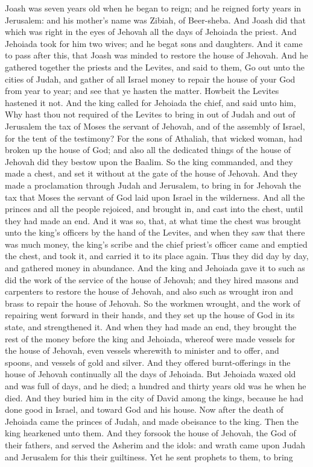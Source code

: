 Joash was seven years old when he began to reign; and he reigned forty years in Jerusalem: and his mother’s name was Zibiah, of Beer-sheba. And Joash did that which was right in the eyes of Jehovah all the days of Jehoiada the priest. And Jehoiada took for him two wives; and he begat sons and daughters.  And it came to pass after this, that Joash was minded to restore the house of Jehovah. And he gathered together the priests and the Levites, and said to them, Go out unto the cities of Judah, and gather of all Israel money to repair the house of your God from year to year; and see that ye hasten the matter. Howbeit the Levites hastened it not. And the king called for Jehoiada the chief, and said unto him, Why hast thou not required of the Levites to bring in out of Judah and out of Jerusalem the tax of Moses the servant of Jehovah, and of the assembly of Israel, for the tent of the testimony? For the sons of Athaliah, that wicked woman, had broken up the house of God; and also all the dedicated things of the house of Jehovah did they bestow upon the Baalim.  So the king commanded, and they made a chest, and set it without at the gate of the house of Jehovah. And they made a proclamation through Judah and Jerusalem, to bring in for Jehovah the tax that Moses the servant of God laid upon Israel in the wilderness. And all the princes and all the people rejoiced, and brought in, and cast into the chest, until they had made an end. And it was so, that, at what time the chest was brought unto the king’s officers by the hand of the Levites, and when they saw that there was much money, the king’s scribe and the chief priest’s officer came and emptied the chest, and took it, and carried it to its place again. Thus they did day by day, and gathered money in abundance. And the king and Jehoiada gave it to such as did the work of the service of the house of Jehovah; and they hired masons and carpenters to restore the house of Jehovah, and also such as wrought iron and brass to repair the house of Jehovah. So the workmen wrought, and the work of repairing went forward in their hands, and they set up the house of God in its state, and strengthened it. And when they had made an end, they brought the rest of the money before the king and Jehoiada, whereof were made vessels for the house of Jehovah, even vessels wherewith to minister and to offer, and spoons, and vessels of gold and silver. And they offered burnt-offerings in the house of Jehovah continually all the days of Jehoiada.  But Jehoiada waxed old and was full of days, and he died; a hundred and thirty years old was he when he died. And they buried him in the city of David among the kings, because he had done good in Israel, and toward God and his house. Now after the death of Jehoiada came the princes of Judah, and made obeisance to the king. Then the king hearkened unto them. And they forsook the house of Jehovah, the God of their fathers, and served the Asherim and the idols: and wrath came upon Judah and Jerusalem for this their guiltiness. Yet he sent prophets to them, to bring 
